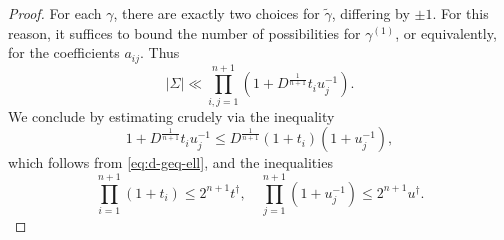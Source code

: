 \begin{proof}
  For each $\gamma$, there are exactly two choices for $\tilde{\gamma}$, differing by $\pm 1$.  For this reason, it suffices to bound the number of possibilities for $\gamma^{(1)}$, or equivalently, for the coefficients $a_{i j}$.  Thus
  \begin{equation}\label{eq:sigma-ll-prod_i}
    |\Sigma| \ll
    \prod_{i,j= 1}^{n+1} \left( 1 + D^{\frac{1}{ n + 1}} t_i u_j^{-1} \right).
  \end{equation}
  We conclude by estimating crudely via the inequality
  \begin{equation*}
    1 + D^{\frac{1}{ n + 1}} t_i u_j^{-1}
    \leq
    D^{\frac{1}{ n + 1}} ( 1 + t_i ) ( 1 + u_j^{-1} ),
  \end{equation*}
  which follows from \eqref{eq:d-geq-ell}, and the inequalities
  \begin{equation*}
    \prod_{i=1}^{n+1} (1 + t_i) \leq 2^{n+1} t^\dagger ,
    \quad
    \prod_{j=1}^{n+1} (1 + u_j^{-1}) \leq 2^{n+1} u^\dagger.
  \end{equation*}
\end{proof}

